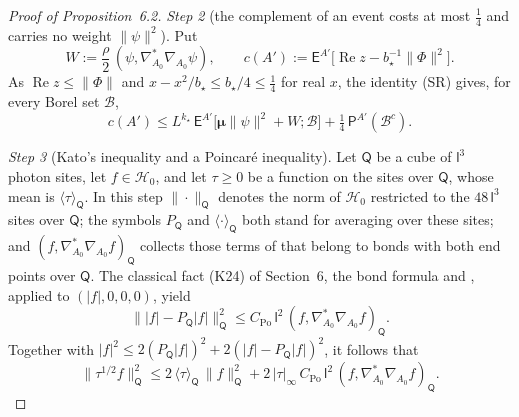 \documentclass[11pt,letterpaper,reqno]{amsart}
\theoremstyle{definition}
\begin{document}
\begin{proof}[Proof of Proposition~6.2]
\emph{Step 2} (the complement of an event costs at most $\frac14$ and carries no weight $\|\psi\|^2$).
Put
\begin{equation*}
W:=\frac\rho2\,(\psi,\nabla^*_{A_0}\nabla_{A_0}\psi),\qquad c(A'):=\mathsf E^{A'}\bigl[\operatorname{Re}z-b_\star^{-1}\|\Phi\|^2\bigr].
\end{equation*}
As $\operatorname{Re}z\le\|\Phi\|$ and $x-x^2/b_\star\le b_\star/4\le\frac14$ for real $x$, the identity (SR) gives, for every Borel set $\mathcal B$,
\begin{equation*}
c(A')\le L^{k_\star}\,\mathsf E^{A'}\bigl[\boldsymbol\mu\|\psi\|^2+W;\mathcal B\bigr]+\tfrac14\,\mathsf P^{A'}(\mathcal B^c).
\end{equation*}

\emph{Step 3} (Kato's inequality and a Poincar\'e inequality).
Let $\mathsf Q$ be a cube of $\mathsf l^3$ photon sites, let $f\in\mathcal H_0$, and let $\tau\ge0$ be a function on the sites over $\mathsf Q$, whose mean is $\langle\tau\rangle_{\mathsf Q}$.
In this step $\|\cdot\|_{\mathsf Q}$ denotes the norm of $\mathcal H_0$ restricted to the $48\,\mathsf l^3$ sites over $\mathsf Q$;
the symbols $P_{\mathsf Q}$ and $\langle\cdot\rangle_{\mathsf Q}$ both stand for averaging over these sites;
and $(f,\nabla^*_{A_0}\nabla_{A_0}f)_{\mathsf Q}$ collects those terms of \cite[(I.O2)]{QEDIII} that belong to bonds with both end points over $\mathsf Q$.
The classical fact (K24) of Section~6, the bond formula \cite[(I.O2)]{QEDIII} and \cite[Proposition~1.4]{QEDIII}, applied to $(|f|,0,0,0)$, yield
\begin{equation*}
\bigl\||f|-P_{\mathsf Q}|f|\bigr\|^2_{\mathsf Q}\le C_{\mathrm{Po}}\,\mathsf l^2\,(f,\nabla^*_{A_0}\nabla_{A_0}f)_{\mathsf Q}.
\end{equation*}
Together with $|f|^2\le2(P_{\mathsf Q}|f|)^2+2(|f|-P_{\mathsf Q}|f|)^2$, it follows that
\begin{equation*}
\|\tau^{1/2}f\|^2_{\mathsf Q}\le2\,\langle\tau\rangle_{\mathsf Q}\,\|f\|^2_{\mathsf Q}+2\,|\tau|_\infty\,C_{\mathrm{Po}}\,\mathsf l^2\,(f,\nabla^*_{A_0}\nabla_{A_0}f)_{\mathsf Q}.
\end{equation*}


\end{proof}
\end{document}
